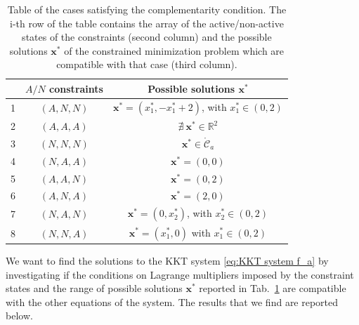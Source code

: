 \documentclass[a4paper,11pt]{article}
\begin{document}
\begin{table}[H]
	\centering
	\begin{tabular}{|c|c|c|}
		\hline
		& $A/N$ constraints & Possible solutions $\textbf{x}^*$ \\
		\hline
		1 & $(A, N, N)$ & $\textbf{x}^* = (x_{1}^*,-x_{1}^*+2)$, with $x_{1}^*\in (0,2)$\\
		2 & $(A, A, A)$ & $\nexists \ \textbf{x}^* \in \mathbb{R}^{2}$\\
		3 & $(N, N, N)$ & $\textbf{x}^* \in \mathring{\mathcal{C}}_{a}$\\
		4 & $(N, A, A)$ & $\textbf{x}^* = (0,0)$\\
		5 & $(A, A, N)$ & $\textbf{x}^* = (0,2)$\\
		6 & $(A, N, A)$ & $\textbf{x}^* = (2,0)$\\
		7 & $(N, A, N)$ & $\textbf{x}^* = (0,x_{2}^*)$, with $x_{2}^* \in (0,2)$\\
		8 & $(N, N, A)$ & $\textbf{x}^* = (x_{1}^*,0)$ with $x_{1}^* \in (0,2)$\\
		\hline
	\end{tabular}
	\caption{Table of the cases satisfying the complementarity condition. The i-th row of the table contains the array of the active/non-active states of the constraints (second column) and the possible solutions $\textbf{x}^*$ of the constrained minimization problem which are compatible with that case (third column).}
	\label{tab:complementarity conditions f_a}
\end{table}
\noindent We want to find the solutions to the KKT system \eqref{eq:KKT system f_a} by investigating if the conditions on Lagrange multipliers imposed by the constraint states and the range of possible solutions $\textbf{x}^*$ reported in Tab.~\ref*{tab:complementarity conditions f_a} are compatible with the other equations of the system.
The results that we find are reported below.
\end{document}
